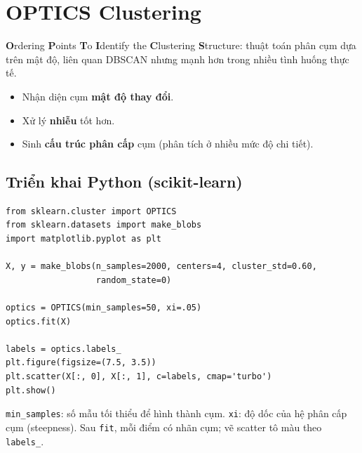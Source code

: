 \section{OPTICS Clustering}
\label{sec:optics}

\begin{dinhnghia}[title={OPTICS}]
\textbf{O}rdering \textbf{P}oints \textbf{T}o \textbf{I}dentify the \textbf{C}lustering \textbf{S}tructure:
thuật toán phân cụm dựa trên mật độ, liên quan DBSCAN nhưng mạnh hơn trong nhiều tình huống thực tế.
\end{dinhnghia}

\begin{ynghia}[title={Ưu thế so với DBSCAN}]
\begin{itemize}
  \item Nhận diện cụm \textbf{mật độ thay đổi}.
  \item Xử lý \textbf{nhiễu} tốt hơn.
  \item Sinh \textbf{cấu trúc phân cấp} cụm (phân tích ở nhiều mức độ chi tiết).
\end{itemize}
\end{ynghia}

\subsection{Triển khai Python (scikit-learn)}

\begin{vidu}[title={Ví dụ OPTICS với make\_blobs}]
\begin{lstlisting}
from sklearn.cluster import OPTICS
from sklearn.datasets import make_blobs
import matplotlib.pyplot as plt

X, y = make_blobs(n_samples=2000, centers=4, cluster_std=0.60,
                  random_state=0)

optics = OPTICS(min_samples=50, xi=.05)
optics.fit(X)

labels = optics.labels_
plt.figure(figsize=(7.5, 3.5))
plt.scatter(X[:, 0], X[:, 1], c=labels, cmap='turbo')
plt.show()
\end{lstlisting}
\end{vidu}

\begin{ynghia}[title={Tham số}]
\texttt{min\_samples}: số mẫu tối thiểu để hình thành cụm.
\texttt{xi}: độ dốc của hệ phân cấp cụm (steepness).
Sau \texttt{fit}, mỗi điểm có nhãn cụm; vẽ scatter tô màu theo \texttt{labels\_}.
\end{ynghia}

